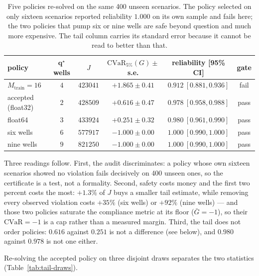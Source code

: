 \begin{table}[htbp]
\centering
\caption{Five policies re-solved on the same \num{400} unseen scenarios.  The
policy selected on only sixteen scenarios reported reliability $1.000$ on its own
sample and fails here; the two policies that pump six or nine wells are safe
beyond question and much more expensive.  The tail column carries its standard
error because it cannot be read to better than that.}
\label{tab:policy-ladder}
\begin{tabular}{lccccc}
\toprule
policy & $\mathbf{q}^\star$ wells & $J$ & $\mathrm{CVaR}_{5\%}(G)\pm$s.e. & reliability [95\% CI] & gate \\
\midrule
$M_{\text{train}}=16$            & $4$ & $\num{423041}$ & $+1.865\pm0.41$ & $0.912\ [0.881,0.936]$ & fail \\
accepted (float32)               & $2$ & $\num{428509}$ & $+0.616\pm0.47$ & $0.978\ [0.958,0.988]$ & pass \\
float64                          & $3$ & $\num{433924}$ & $+0.251\pm0.32$ & $0.980\ [0.961,0.990]$ & pass \\
six wells                        & $6$ & $\num{577917}$ & $-1.000\pm0.00$ & $1.000\ [0.990,1.000]$ & pass \\
nine wells                       & $9$ & $\num{821250}$ & $-1.000\pm0.00$ & $1.000\ [0.990,1.000]$ & pass \\
\bottomrule
\end{tabular}
\end{table}

Three readings follow.  First, the audit discriminates: a policy whose own
sixteen scenarios showed no violation fails decisively on \num{400} unseen ones,
so the certificate is a test, not a formality.  Second, safety costs money and the
first two percent costs the most: $+1.3\%$ of $J$ buys a smaller tail estimate,
while removing every observed violation costs $+35\%$ (six wells) or $+92\%$
(nine wells) --- and those two policies saturate the compliance metric at its
floor ($\bar G=-1$), so their $\mathrm{CVaR}=-1$ is a cap rather than a measured
margin.  Third, the tail does not order policies: $0.616$ against $0.251$ is not
a difference (see below), and $0.980$ against $0.978$ is not one either.

Re-solving the accepted policy on three disjoint draws separates the two
statistics (Table~\ref{tab:tail-draws}).

